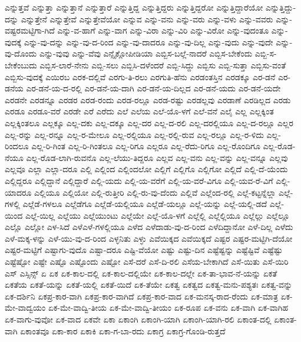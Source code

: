 {ಎನ್ನುತ್ತವೆ
ಎನ್ನುತ್ತಾ
ಎನ್ನುತ್ತಾನೆ
ಎನ್ನುತ್ತಾರೆ
ಎನ್ನುತ್ತಿದ್ದ
ಎನ್ನುತ್ತಿದ್ದರು
ಎನ್ನುತ್ತಿದ್ದರೋ
ಎನ್ನುತ್ತಿದ್ದಾರೆಯೋ
ಎನ್ನುತ್ತಿದ್ದು-ದನ್ನು
ಎನ್ನುತ್ತೇನೆ
ಎನ್ನುತ್ತೇವೆ
ಎನ್ನುತ್ತೇವೆಯೋ
ಎನ್ನುವ
ಎನ್ನು-ವನು
ಎನ್ನು-ವರು
ಎನ್ನು-ವಳು
ಎನ್ನು-ವವರು
ಎನ್ನು-ವಷ್ಟರಮಟ್ಟಿಗಾ-ಗಿದೆ
ಎನ್ನು-ವ-ಹಾಗೆ
ಎನ್ನು-ವಾಗ
ಎನ್ನು-ವಿರಾ
ಎನ್ನು-ವಿರಿ
ಎನ್ನು-ವಿರೋ
ಎನ್ನು-ವುದಂತೂ
ಎನ್ನು-ವುದಕ್ಕೆ
ಎನ್ನು-ವು-ದನ್ನು
ಎನ್ನು-ವು-ದ-ರಿಂದ
ಎನ್ನು-ವು-ದಾದರೂ
ಎನ್ನು-ವು-ದಿಲ್ಲ
ಎನ್ನು-ವುದು
ಎನ್ನು-ವುದೇ
ಎನ್ನು-ವು-ದೊಂದು
ಎನ್ನು-ವುವು
ಎನ್ನು-ವೆವು
ಎನ್ಸೈಕ್ಲೋಪೀಡಿಯಾ
ಎಬ್ಬಿಸ-ಬಲ್ಲೆ-ನಾದರೆ
ಎಬ್ಬಿಸ-ಬೇಕೆಂದು
ಎಬ್ಬಿ-ಸ-ಬೇಕೆಂಬುದು
ಎಬ್ಬಿಸ-ಲಾರೆ-ನೇನು
ಎಬ್ಬಿ-ಸಲು
ಎಬ್ಬಿಸಿ-ದಳೆಂದರೆ
ಎಬ್ಬಿ-ಸಿದ್ದು
ಎಬ್ಬಿಸು
ಎಬ್ಬಿ-ಸುತ್ತಾ
ಎಬ್ಬಿಸು-ವಂತೆ
ಎಬ್ಬಿಸು-ವುದಕ್ಕೆ
ಎಯಿರಬ
ಎರಕ-ದಲ್ಲಿವೆ
ಎರಗು-ತಿ-ರಲು
ಎರಗುತಿ-ಹೆನು
ಎರಡಂತಸ್ತಿನ
ಎರಡಕ್ಕೂ
ಎರ-ಡನೆ
ಎರ-ಡನೆಯ
ಎರ-ಡನೆ-ಯ-ದ-ರಲ್ಲಿ
ಎರ-ಡನೆ-ಯ-ದಾಗಿ
ಎರ-ಡನೆ-ಯ-ದಿಲ್ಲದ
ಎರ-ಡನೆ-ಯದು
ಎರ-ಡನೆ-ಯದೇ
ಎರಡನೇ
ಎರಡನ್ನೂ
ಎರಡರ
ಎರಡ-ರಂದು
ಎರಡ-ರಲ್ಲೂ
ಎರಡ-ರಷ್ಟು
ಎರಡಲ್ಲವು
ಎರಡಾಣೆ
ಎರಡಿಲ್ಲದ
ಎರಡು
ಎರಡೂ
ಎರಡೂ-ವರೆ
ಎರಡೇ
ಎರೆ
ಎರೆದು
ಎಲೆ
ಎಲೆಯ
ಎಲೆ-ಯೊ-ಳಗೆ
ಎಲೆ-ವನೆ
ಎಲೈ
ಎಲ್ಲ
ಎಲ್ಲಕ್ಕಿಂತ
ಎಲ್ಲಕ್ಕಿಂತಲೂ
ಎಲ್ಲಕ್ಕೂ
ಎಲ್ಲ-ದಕು
ಎಲ್ಲ-ದಕ್ಕೂ
ಎಲ್ಲ-ದರ
ಎಲ್ಲ-ದ-ರಲಿ
ಎಲ್ಲ-ದರಲ್ಲಿಯೂ
ಎಲ್ಲ-ದ-ರಲ್ಲೂ
ಎಲ್ಲರ
ಎಲ್ಲ-ರನ್ನು
ಎಲ್ಲ-ರನ್ನೂ
ಎಲ್ಲ-ರ-ಮೇಲೂ
ಎಲ್ಲ-ರಲ್ಲಿಯೂ
ಎಲ್ಲ-ರಲ್ಲಿ-ರುವ
ಎಲ್ಲ-ರಲ್ಲೂ
ಎಲ್ಲ-ರ-ಳಿದು
ಎಲ್ಲ-ರಿಂದಲೂ
ಎಲ್ಲ-ರಿ-ಗಿಂತ
ಎಲ್ಲ-ರಿ-ಗಿಂತಲೂ
ಎಲ್ಲ-ರಿಗೂ
ಎಲ್ಲರೂ
ಎಲ್ಲ-ರೆದು-ರಿಗೂ
ಎಲ್ಲ-ರೊಂದಿಗೂ
ಎಲ್ಲ-ರೊಡ-ನೆಯೂ
ಎಲ್ಲ-ರೊಡ-ಲಾಗಿ-ರುವನೊ
ಎಲ್ಲ-ಲೆಯು-ತಿದ್ದರೂ
ಎಲ್ಲವ
ಎಲ್ಲ-ವನು
ಎಲ್ಲ-ವನ್ನು
ಎಲ್ಲ-ವನ್ನೂ
ಎಲ್ಲವು
ಎಲ್ಲವೂ
ಎಲ್ಲಾ
ಎಲ್ಲಾ-ದರೂ
ಎಲ್ಲಿ
ಎಲ್ಲಿಂದ
ಎಲ್ಲಿಂದಲೋ
ಎಲ್ಲಿಗೆ
ಎಲ್ಲಿಗೊ
ಎಲ್ಲಿಗೋ
ಎಲ್ಲಿದೆ
ಎಲ್ಲಿ-ದೆ-ಯೆಂದು
ಎಲ್ಲಿದ್ದರೂ
ಎಲ್ಲಿದ್ದಾನೆ
ಎಲ್ಲಿದ್ದಾರೆ
ಎಲ್ಲಿ-ಯದು
ಎಲ್ಲಿ-ಯ-ವರೆಗೆ
ಎಲ್ಲಿ-ಯ-ವರೆ-ವಿಗೂ
ಎಲ್ಲಿ-ಯವ-ರೆ-ವಿಗೆ
ಎಲ್ಲಿ-ಯಾದರೂ
ಎಲ್ಲಿಯೂ
ಎಲ್ಲಿಯೋ
ಎಲ್ಲಿ-ರುತ್ತೀರಿ
ಎಲ್ಲಿ-ರು-ವು-ದೆಂದು
ಎಲ್ಲಿವೆ
ಎಲ್ಲೆಂದ-ರಲ್ಲಿ
ಎಲ್ಲೆ-ಕಟ್ಟನ್ನೆಲ್ಲಾ
ಎಲ್ಲೆ-ಗಳಲ್ಲಿ
ಎಲ್ಲೆಡೆ-ಗಳಲೂ
ಎಲ್ಲೆಡೆಗೂ
ಎಲ್ಲೆಡೆ-ಯಲ್ಲಿಯೂ
ಎಲ್ಲೆಡೆ-ಯಲ್ಲೂ
ಎಲ್ಲೆ-ಯನ್ನು
ಎಲ್ಲೆ-ಯಲ್ಲಿ-ಡದೆ
ಎಲ್ಲೆ-ಯಿಂದ
ಎಲ್ಲೆ-ಯಿಲ್ಲ
ಎಲ್ಲೆಯು
ಎಲ್ಲೆಯುಂಟು
ಎಲ್ಲೆಯೇ
ಎಲ್ಲೆ-ಯೊ-ಳಗೆ
ಎಲ್ಲೆಲ್ಲಿ
ಎಲ್ಲೆಲ್ಲಿಯೂ
ಎಲ್ಲೆಲ್ಲು
ಎಲ್ಲೆಲ್ಲೂ
ಎಲ್ಲೊ
ಎಲ್ಲೋ
ಎಳ-ಸಿದೆ
ಎಳೆಎಳೆ-ಗಳಲ್ಲಿಯೂ
ಎಳೆದ
ಎಳೆದಾಡು-ವು-ದ-ರಿಂದ
ಎಳೆದಿದ್ದಾನೋ
ಎಳೆ-ದಿಲ್ಲ
ಎಳೆದು
ಎಳೆ-ಮಕ್ಕ-ಳನ್ನು
ಎಳೆ-ಯು-ವು-ದ-ರಿಂದ
ಎಳ್ಳನಿತು
ಎಳ್ಳು
ಎವೆಯಿಕ್ಕದ
ಎವೆಯಿಕ್ಕದೆ
ಎಷ್ಟರ
ಎಷ್ಟರ-ಮಟ್ಟಿಗಿ-ದೆಯೋ
ಎಷ್ಟರ-ಮಟ್ಟಿಗೆ
ಎಷ್ಟಾಗು-ವುದೊ
ಎಷ್ಟಾ-ದರೂ
ಎಷ್ಟಿ-ವೆಯೋ
ಎಷ್ಟು
ಎಷ್ಟು-ದಿನ
ಎಷ್ಟೆಷ್ಟನ್ನು
ಎಷ್ಟೆಷ್ಟಿವೆ
ಎಷ್ಟೆಷ್ಟು
ಎಷ್ಟೆಷ್ಟೋ
ಎಷ್ಟೇ
ಎಷ್ಟೊ
ಎಷ್ಟೊಂದು
ಎಷ್ಟೋ
ಎಸೆ-ದರೆ
ಎಸೆ-ದಿ-ರಲಿ
ಎಸೆಯ-ಬೇಕಾಗಿದೆ
ಎಸೆ-ಯಿತು
ಎಸೆ-ಯಿರಿ
ಎಸ್
ಎಸ್ಸಿನ್ಸ್
ಏ
ಏಕ
ಏಕ-ಕಾಲ-ದಲ್ಲಿ
ಏಕ-ಕಾಲ-ದಲ್ಲಿಯೇ
ಏಕ-ಕಾಲ-ದಲ್ಲೇ
ಏಕ-ತಾ-ಭಾವ-ನೆ-ಯನ್ನು
ಏಕತೆ
ಏಕತೆಯ
ಏಕತೆ-ಯನ್ನು
ಏಕತೆ-ಯಲ್ಲಿ
ಏಕತೆ-ಯಿದೆ
ಏಕ-ತೆಯೇ
ಏಕತ್ವ
ಏಕತ್ವದ
ಏಕತ್ವ-ಮನು-ಪಶ್ಯತಃ
ಏಕತ್ವ-ವನ್ನು
ಏಕ-ದರ್ಶಿನಿ
ಏಕಪ್ರ-ಕಾರ-ವಾಗಿ
ಏಕಪ್ರ-ಕಾರ-ವಾಗಿದೆ
ಏಕಪ್ರ-ಕಾರ-ವಾದ
ಏಕ-ಮನಸ್ಕ-ರಾದ-ರೆಂದು
ಏಕ-ಮಾತ್ರ
ಏಕ-ಮೇ-ವಾದ್ವಯಂ
ಏಕ-ಮೇ-ವಾದ್ವಿ-ತೀಯ
ಏಕ-ಮೇ-ವಾದ್ವಿ-ತೀಯಂ
ಏಕ-ರೂಪ
ಏಕ-ವನು
ಏಕ-ವಾಗಿ
ಏಕ-ವಾಗಿಹ
ಏಕ-ವಾಗು-ವುವೋ
ಏಕ-ವಾದ
ಏಕವೇ
ಏಕಾ
ಏಕಾಂಗಿ
ಏಕಾಂಗಿ-ಯಾಗಿ
ಏಕಾಂಗಿ-ಯಾಗಿ-ರಲಿ
ಏಕಾಂತ-ದಲ್ಲಿ
ಏಕಾಂತ-ವಾಗಿ
ಏಕಾಂತವೂ
ಏಕಾ-ಕಾರ
ಏಕಾಕಿ
ಏಕಾ-ಗ-ಬಾ-ರದು
ಏಕಾಗ್ರ
ಏಕಾಗ್ರ-ಗೊಂಡಿ-ರುತ್ತದೆ
}
